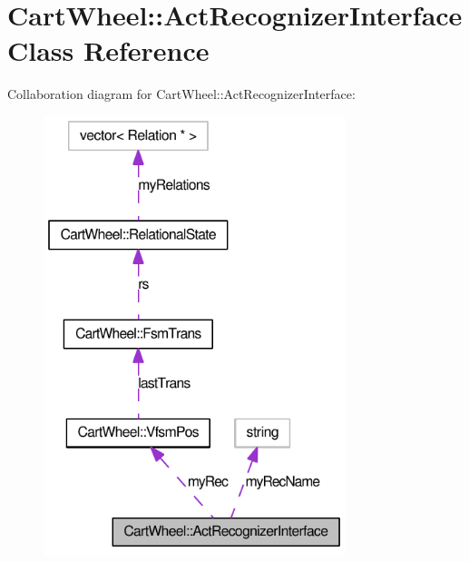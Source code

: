 \hypertarget{classCartWheel_1_1ActRecognizerInterface}{
\section{CartWheel::ActRecognizerInterface Class Reference}
\label{classCartWheel_1_1ActRecognizerInterface}
}


Collaboration diagram for CartWheel::ActRecognizerInterface:\nopagebreak
\begin{figure}[H]
\begin{center}
\leavevmode
\includegraphics[width=249pt]{classCartWheel_1_1ActRecognizerInterface__coll__graph}
\end{center}
\end{figure}
